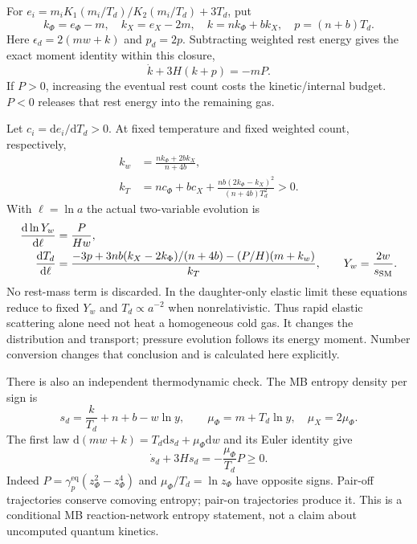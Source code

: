 \documentclass[11pt]{article}
\newcommand{\dd}{\mathrm d}
\newcommand{\eq}{\mathrm{eq}}
\begin{document}
For $e_i=m_iK_1(m_i/T_d)/K_2(m_i/T_d)+3T_d$, put
\begin{equation}
 k_\Phi=e_\Phi-m,\quad k_X=e_X-2m,\quad
 k=nk_\Phi+bk_X,\quad p=(n+b)T_d.
\end{equation}
Here $\epsilon_d=2(mw+k)$ and $p_d=2p$. Subtracting weighted rest energy
gives the exact moment identity within this closure,
\begin{equation}
 \dot k+3H(k+p)=-mP.
\end{equation}
If $P>0$, increasing the eventual rest count costs the kinetic/internal
budget. $P<0$ releases that rest energy into the remaining gas.

Let $c_i=\dd e_i/\dd T_d>0$. At fixed temperature and fixed weighted count,
respectively,
\begin{align}
 k_w&=\frac{nk_\Phi+2bk_X}{n+4b},\\
 k_T&=nc_\Phi+bc_X+
 \frac{nb(2k_\Phi-k_X)^2}{(n+4b)T_d^2}>0.
\end{align}
With $\ell=\ln a$ the actual two-variable evolution is
\begin{align}
 \frac{\dd\ln Y_w}{\dd\ell}&=\frac{P}{Hw},\\
 \frac{\dd T_d}{\dd\ell}&=
 \frac{-3p+3nb(k_X-2k_\Phi)/(n+4b)-(P/H)(m+k_w)}{k_T},\qquad
 Y_w=\frac{2w}{s_{\rm SM}}.
\end{align}
No rest-mass term is discarded. In the daughter-only elastic limit these
equations reduce to fixed $Y_w$ and $T_d\propto a^{-2}$ when nonrelativistic.
Thus rapid elastic scattering alone need not heat a homogeneous cold gas.
It changes the distribution and transport; pressure evolution follows its
energy moment. Number conversion changes that conclusion and is calculated
here explicitly.

There is also an independent thermodynamic check. The MB entropy density
per sign is
\begin{equation}
 s_d=\frac{k}{T_d}+n+b-w\ln y,\qquad
 \mu_\Phi=m+T_d\ln y,\quad \mu_X=2\mu_\Phi.
\end{equation}
The first law $\dd(mw+k)=T_d\dd s_d+\mu_\Phi\dd w$ and its Euler
identity give
\begin{equation}
 \dot s_d+3Hs_d=-\frac{\mu_\Phi}{T_d}P\ge0.
\end{equation}
Indeed $P=\gamma_p^\eq(z_\Phi^2-z_\Phi^4)$ and
$\mu_\Phi/T_d=\ln z_\Phi$ have opposite signs. Pair-off trajectories
conserve comoving entropy; pair-on trajectories produce it. This is a
conditional MB reaction-network entropy statement, not a claim about
uncomputed quantum kinetics.
\end{document}
